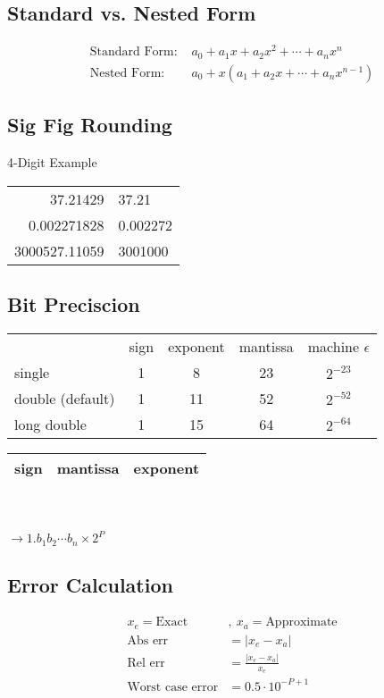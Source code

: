 \documentclass[10pt]{article}
\begin{document}
\begin{multicols}{2}
    \small
    \begin{minipage}{\columnwidth}
        \subsection*{Standard vs. Nested Form}
        \begin{align*}
            \text{Standard Form: } & a_0 + a_1 x + a_2 x^2 + \cdots + a_n x^n \\
            \text{Nested Form: } & a_0 + x(a_1 + a_2x + \cdots + a_nx^{n-1})
        \end{align*}
        \subsection*{Sig Fig Rounding}
        \tiny
        4-Digit Example \\
        \small
        \begin{tabular}{rl}
            37.21429 & 37.21 \\
            0.002271828 & 0.002272 \\
            3000527.11059 & 3001000 \\
        \end{tabular}
        \subsection*{Bit Preciscion}
        \begin{tabular}{lcccc}
            & sign & exponent & mantissa & machine \(\epsilon\) \\
            single & 1 & 8 & 23 & \(2^{-23}\) \\
            double (default) & 1 & 11 & 52 & \(2^{-52}\) \\
            long double & 1 & 15 & 64 & \(2^{-64}\)
        \end{tabular}
        \begin{multicols}{2}
            \begin{tabular}{|c|c|c|}
                \hline
                sign & mantissa & exponent \\
                \hline
            \end{tabular}
            \\ \\
            \(\rightarrow 1.b_1b_2 \cdots b_n \times 2^P\)
        \end{multicols}
        \subsection*{Error Calculation}
        \begin{align*}
            x_e = \text{Exact} & ,\ x_a = \text{Approximate} \\
            \text{Abs err} & = \left| x_{e} - x_{a} \right| \\
            \text{Rel err} & = \frac{\left| x_{e} - x_{a} \right|}{x_{e}} \\
            \text{Worst case error} & = 0.5 \cdot 10^{-P+1}
        \end{align*}

\end{minipage}
\end{multicols}
\end{document}
